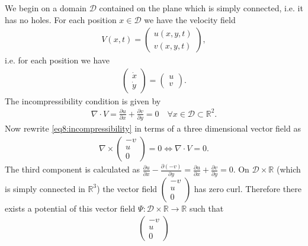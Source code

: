 \begin{ex}
	We begin on a domain $\mathcal{D}$ contained on the plane which is simply connected, i.e. it has no holes. For each position $x\in \mathcal{D}$ we have the velocity field
	\begin{align}
		{V}(x,t) = 
		\begin{pmatrix}
			u(x,y,t) \\ v(x,y,t)
		\end{pmatrix},
	\end{align}
	i.e. for each position we have
	 \begin{align}
		\begin{pmatrix}
			\dot{x} \\ \dot{y}
		\end{pmatrix}
		= 
		\begin{pmatrix}
			u \\v
		\end{pmatrix}
		.
	\end{align}
The incompressibility condition is given by 
\begin{align}
	\nabla \cdot V = \frac{\partial u}{\partial x} + \frac{\partial v}{\partial y}= 0\quad \forall x\in \mathcal{D}\subset \mathbb{R}^{2}. \label{eq8:incompressibility}
\end{align}
Now rewrite \eqref{eq8:incompressibility} in terms of a three dimensional vector field as
\begin{align}
	\nabla \times 
	\begin{pmatrix}
		-v \\ u \\ 0 
	\end{pmatrix}
	=0 \Leftrightarrow
	\nabla \cdot V = 0.
\end{align}
The third component is calculated as $\frac{\partial u}{\partial x} - \frac{\partial (-v)}{\partial y} = \frac{\partial u}{\partial x} + \frac{\partial v}{\partial y} = 0$. On $\mathcal{D}\times \mathbb{R}$ (which is simply connected in $\mathbb{R}^{3}$) the vector field $
\begin{pmatrix}
	-v \\ u \\ 0
\end{pmatrix}
$ has zero curl. Therefore there exists a potential of this vector field $\Psi:\mathcal{D}\times \mathbb{R} \to \mathbb{R}$ such that
\begin{align}
\begin{pmatrix}
	-v \\ u \\ 0 

\end{pmatrix}
\end{align}
\end{ex}
